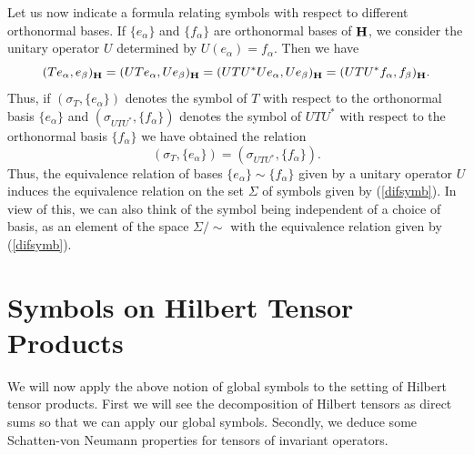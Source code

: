 \documentclass[a4paper,12pt,reqno]{amsart}
\renewcommand\eqref[1]{(\ref{#1})} %
\theoremstyle{definition}
\theoremstyle{remark}
\numberwithin{equation}{section}
\newcommand{\beq}{\begin{equation}}
\newcommand{\eq}{\end{equation}}
\DeclareMathOperator{\Hcal}{\bf H}
\begin{document}
Let us now indicate a formula relating symbols 
with respect to different orthonormal bases. 
If $\{e_{\alpha}\}$ and $\{f_{\alpha}\}$ are orthonormal bases of 
$\Hcal$, we consider the unitary operator $U$ determined by 
$U(e_{\alpha})=f_{\alpha}$. Then we have
\[
(Te_{\alpha}, e_{\beta})_{\Hcal}=(UTe_{\alpha}, Ue_{\beta})_{\Hcal}
=(UTU^*Ue_{\alpha}, Ue_{\beta})_{\Hcal}
=(UTU^*f_{\alpha}, f_{\beta})_{\Hcal}.
\]
Thus, if $(\sigma_{T}, \{e_{\alpha}\})$ denotes the symbol of $T$ with respect to the 
orthonormal basis $\{e_{\alpha}\}$ and $(\sigma_{UTU^*}, \{f_{\alpha}\})$ 
denotes the symbol of $UTU^*$ with respect to the orthonormal basis $\{f_{\alpha}\}$ 
we have obtained the relation
\beq\label{difsymb} (\sigma_{T}, \{e_{\alpha}\})=({\sigma_{UTU^*}}, \{f_{\alpha}\}).\eq
Thus, the equivalence relation of bases $\{e_{\alpha}\}\sim  \{f_{\alpha}\}$ given by 
a unitary operator $U$ induces
the equivalence relation on the set $\Sigma$ of symbols given by 
\eqref{difsymb}. In view of this,
we can also think of the symbol being independent of a choice of basis, as an element of the space
$\Sigma/\sim$ with the equivalence relation given by
\eqref{difsymb}.

\section{ Symbols on Hilbert Tensor Products}\label{sec5}
We will now apply the above notion of global symbols to the setting of Hilbert tensor products. First we will see the decomposition of Hilbert tensors as direct sums so that we can apply our global symbols. Secondly, we deduce some  Schatten-von Neumann properties for tensors of invariant operators.  \\
\end{document}
